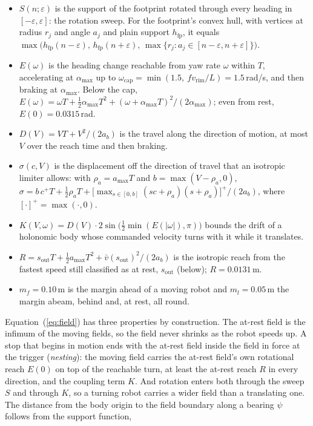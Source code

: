 \documentclass[sensors,article,submit,moreauthors]{Definitions/mdpi}
\begin{document}
\begin{itemize}
\item $S(n;\varepsilon)$ is the support of the footprint rotated through every heading in $[-\varepsilon,\varepsilon]$: the rotation sweep. For the footprint's convex hull, with vertices at radius $r_j$ and angle $a_j$ and plain support $h_{\text{fp}}$, it equals $\max\big(h_{\text{fp}}(n-\varepsilon),\, h_{\text{fp}}(n+\varepsilon),\, \max\{r_j : a_j \in [n-\varepsilon, n+\varepsilon]\}\big)$. %
\item $E(\omega)$ is the heading change reachable from yaw rate $\omega$ within $T$, accelerating at $\alpha_{\max}$ up to $\omega_{\text{cap}} = \min(1.5,\ f v_{\text{rim}}/L) = 1.5$\,rad/s, and then braking at $\alpha_{\max}$. Below the cap, $E(\omega) = \omega T + \tfrac12\alpha_{\max}T^2 + (\omega + \alpha_{\max}T)^2/(2\alpha_{\max})$; even from rest, $E(0) = 0.0315$\,rad. %
\item $D(V) = V T + V^2/(2a_b)$ is the travel along the direction of motion, at most $V$ over the reach time and then braking. %
\item $\sigma(c, V)$ is the displacement off the direction of travel that an isotropic limiter allows: with $\rho_a = a_{\max}T$ and $b = \max(V - \rho_a, 0)$, $\sigma = b\,c^+ T + \tfrac12 \rho_a T + \big[\max_{s\in[0,b]} (s c + \rho_a)(s + \rho_a)\big]^+/(2a_b)$, where $[\cdot]^+ = \max(\cdot, 0)$. %
\item $K(V,\omega) = D(V)\cdot 2\sin\!\big(\tfrac12\min(E(|\omega|), \pi)\big)$ bounds the drift of a holonomic body whose commanded velocity turns with it while it translates. %
\item $R = s_{\text{out}}T + \tfrac12 a_{\max}T^2 + \bar{v}(s_{\text{out}})^2/(2a_b)$ is the isotropic reach from the fastest speed still classified as at rest, $s_{\text{out}}$ (below); $R = 0.0131$\,m. %
\item $m_f = 0.10$\,m is the margin ahead of a moving robot and $m_l = 0.05$\,m the margin abeam, behind and, at rest, all round.
\end{itemize}
Equation~(\ref{eq:field}) has three properties by construction. The at-rest field is the infimum of the moving fields, so the field never shrinks as the robot speeds up. A stop that begins in motion ends with the at-rest field inside the field in force at the trigger (\emph{nesting}): the moving field carries the at-rest field's own rotational reach $E(0)$ on top of the reachable turn, at least the at-rest reach $R$ in every direction, and the coupling term $K$. And rotation enters both through the sweep $S$ and through $K$, so a turning robot carries a wider field than a translating one. The distance from the body origin to the field boundary along a bearing $\psi$ follows from the support function,
\end{document}
